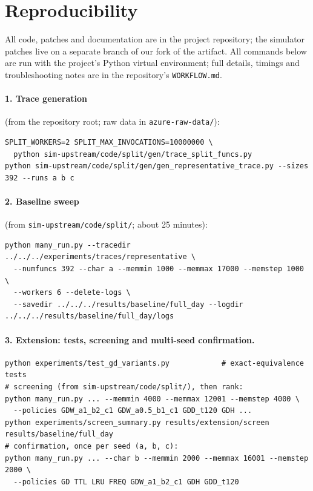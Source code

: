\documentclass[11pt,a4paper]{article}
\newcommand{\code}[1]{\texttt{#1}}
\begin{document}



\appendix
\section{Reproducibility}
\label{app:repro}

All code, patches and documentation are in the project repository; the simulator patches live on
a separate branch of our fork of the artifact. All commands below are run with the project's
Python virtual environment; full details, timings and troubleshooting notes are in the
repository's \code{WORKFLOW.md}.

\paragraph{1. Trace generation} (from the repository root; raw data in \code{azure-raw-data/}):
\begin{lstlisting}
SPLIT_WORKERS=2 SPLIT_MAX_INVOCATIONS=10000000 \
  python sim-upstream/code/split/gen/trace_split_funcs.py
python sim-upstream/code/split/gen/gen_representative_trace.py --sizes 392 --runs a b c
\end{lstlisting}

\paragraph{2. Baseline sweep} (from \code{sim-upstream/code/split/}; about 25 minutes):
\begin{lstlisting}
python many_run.py --tracedir ../../../experiments/traces/representative \
  --numfuncs 392 --char a --memmin 1000 --memmax 17000 --memstep 1000 \
  --workers 6 --delete-logs \
  --savedir ../../../results/baseline/full_day --logdir ../../../results/baseline/full_day/logs
\end{lstlisting}

\paragraph{3. Extension: tests, screening and multi-seed confirmation.}
\begin{lstlisting}
python experiments/test_gd_variants.py            # exact-equivalence tests
# screening (from sim-upstream/code/split/), then rank:
python many_run.py ... --memmin 4000 --memmax 12001 --memstep 4000 \
  --policies GDW_a1_b2_c1 GDW_a0.5_b1_c1 GDD_t120 GDH ...
python experiments/screen_summary.py results/extension/screen results/baseline/full_day
# confirmation, once per seed (a, b, c):
python many_run.py ... --char b --memmin 2000 --memmax 16001 --memstep 2000 \
  --policies GD TTL LRU FREQ GDW_a1_b2_c1 GDH GDD_t120
\end{lstlisting}
\end{document}
